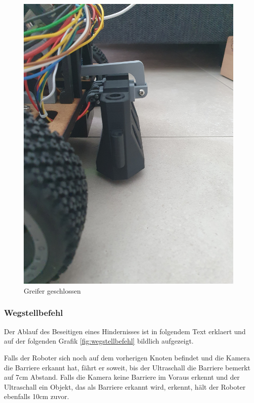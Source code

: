\begin{figure}[H]
\begin{minipage}[b]{0.49\textwidth}
  \includegraphics[width=\textwidth, angle=-90]{assets/MT/greifer-close.jpg}
  \caption{Greifer geschlossen}
  \label{fig:griefe-rclose1}
\end{minipage}
\end{figure}
\subsubsection{Wegstellbefehl}

Der Ablauf des Beseitigen eines Hindernisses ist in folgendem Text erklaert und auf der folgenden Grafik \ref{fig:wegstellbefehl} bildlich aufgezeigt.

Falls der Roboter sich noch auf dem vorherigen Knoten befindet und die Kamera die Barriere erkannt hat, fährt er soweit, bis der Ultraschall die Barriere bemerkt auf 7cm Abstand. 
Falls die Kamera keine Barriere im Voraus erkennt und der Ultraschall ein Objekt, das als Barriere erkannt wird, erkennt, hält der Roboter ebenfalls 10cm zuvor.

